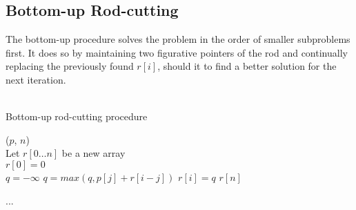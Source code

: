 \subsection{Bottom-up Rod-cutting}
The bottom-up procedure solves the problem in the order of smaller subproblems
first. It does so by maintaining two figurative pointers of the rod and
continually replacing the previously found $r[i]$, should it to find a better
solution for the next iteration. \\\\
\begin{algorithm}[H]
	\caption{Bottom-up rod-cutting procedure}
	\label{alg:cut-rod|type:bottom-up}
	
	
	
	
	\BlankLine
	\BottomUpCutRod($p$, $n$) \\
	\Begin
	{
		Let $r[0 \dots n]$ be a new array \\
		$r[0] = 0$ \\
		{
			$q = -\infty$
			{
				$q = max(q, p[j] + r[i - j])$
			}
			$r[i] = q$
		}
		\Return $r[n]$
	}
\end{algorithm}
...
